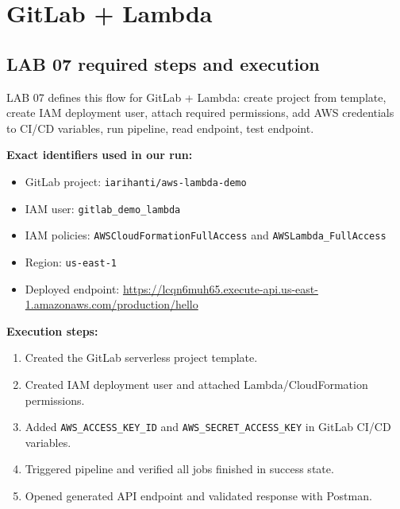 \documentclass{article}
\begin{document}
\raggedbottom
\setlength{\intextsep}{6pt plus 2pt minus 2pt}
\setlength{\floatsep}{6pt plus 2pt minus 2pt}
\setlength{\textfloatsep}{6pt plus 2pt minus 2pt}

\tableofcontents
\newpage

\section{GitLab + Lambda}

\subsection{LAB 07 required steps and execution}
LAB 07 defines this flow for GitLab + Lambda: create project from template, create IAM deployment user, attach required permissions, add AWS credentials to CI/CD variables, run pipeline, read endpoint, test endpoint.

\textbf{Exact identifiers used in our run:}
\begin{itemize}
    \item GitLab project: \texttt{iarihanti/aws-lambda-demo}
    \item IAM user: \texttt{gitlab\_demo\_lambda}
    \item IAM policies: \texttt{AWSCloudFormationFullAccess} and \texttt{AWSLambda\_FullAccess}
    \item Region: \texttt{us-east-1}
    \item Deployed endpoint: \url{https://lcqn6muh65.execute-api.us-east-1.amazonaws.com/production/hello}
\end{itemize}

\textbf{Execution steps:}
\begin{enumerate}
    \item Created the GitLab serverless project template.
    \item Created IAM deployment user and attached Lambda/CloudFormation permissions.
    \item Added \texttt{AWS\_ACCESS\_KEY\_ID} and \texttt{AWS\_SECRET\_ACCESS\_KEY} in GitLab CI/CD variables.
    \item Triggered pipeline and verified all jobs finished in success state.
    \item Opened generated API endpoint and validated response with Postman.
\end{enumerate}
\end{document}
